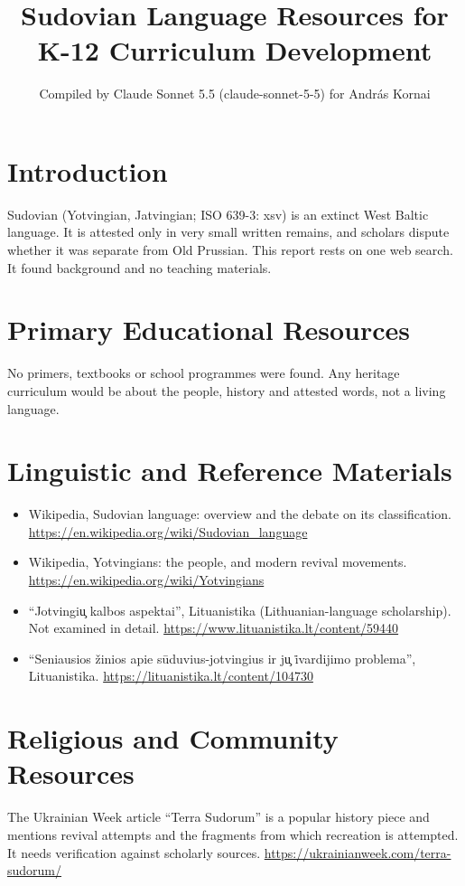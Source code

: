 \documentclass[12pt]{article}
\title{Sudovian Language Resources for K-12 Curriculum Development}
\author{Compiled by Claude Sonnet 5.5 (claude-sonnet-5-5) for Andr\'as Kornai}
\date{}
\begin{document}
\maketitle

\section{Introduction}
Sudovian (Yotvingian, Jatvingian; ISO 639-3: xsv) is an extinct West Baltic language. It is attested only in very small written remains, and scholars dispute whether it was separate from Old Prussian. This report rests on one web search. It found background and no teaching materials.

\section{Primary Educational Resources}
No primers, textbooks or school programmes were found. Any heritage curriculum would be about the people, history and attested words, not a living language.

\section{Linguistic and Reference Materials}
\begin{itemize}
\item Wikipedia, Sudovian language: overview and the debate on its classification. \url{https://en.wikipedia.org/wiki/Sudovian_language}
\item Wikipedia, Yotvingians: the people, and modern revival movements. \url{https://en.wikipedia.org/wiki/Yotvingians}
\item ``Jotvingi\c{u} kalbos aspektai'', Lituanistika (Lithuanian-language scholarship). Not examined in detail. \url{https://www.lituanistika.lt/content/59440}
\item ``Seniausios \v{z}inios apie s\={u}duvius-jotvingius ir j\c{u} \.{i}vardijimo problema'', Lituanistika. \url{https://lituanistika.lt/content/104730}
\end{itemize}

\section{Religious and Community Resources}
The Ukrainian Week article ``Terra Sudorum'' is a popular history piece and mentions revival attempts and the fragments from which recreation is attempted. It needs verification against scholarly sources. \url{https://ukrainianweek.com/terra-sudorum/}
\end{document}
